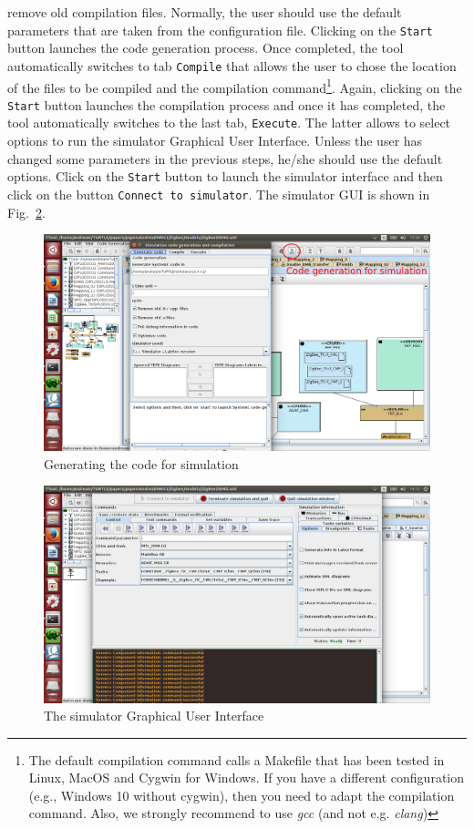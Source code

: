 \documentclass{llncs}
\newcommand{\screenshotsize}{1.0\textwidth}
\begin{document}
remove old compilation files. Normally, the user should use the default parameters that are taken from the configuration
file. Clicking on the \texttt{Start} button launches the code generation process. Once completed, the tool automatically
switches to tab \texttt{Compile} that allows the user to chose the location of the files to be compiled and the
compilation command\footnote{The default compilation command calls a Makefile that has been tested in Linux, MacOS and Cygwin for Windows. If you have a different configuration (e.g., Windows 10 without cygwin), then you need to adapt the compilation command. Also, we strongly recommend to use \textit{gcc} (and not e.g. \textit{clang})}. Again, clicking on the \texttt{Start} button launches the compilation process and once it has
completed, the tool automatically switches to the last tab, \texttt{Execute}. The latter allows to select options to run
the simulator Graphical User Interface. Unless the user has changed some parameters in the previous steps, he/she should
use the default options. Click on the \texttt{Start} button to launch the simulator interface and then click on the
button \texttt{Connect to simulator}. The simulator GUI is shown in Fig.~\ref{fig:SimuGUI1}.
%
\begin{figure}[!htbp]
	\centering
	\includegraphics[width=\screenshotsize]{figures/screenshot/CodeGenSimu.png}
	\caption{Generating the code for simulation}
	\label{fig:CodeGen1}
\end{figure}
%
\begin{figure}[!htbp]
	\centering
	\includegraphics[width=\screenshotsize]{figures/screenshot/SimuGUI1.png}
	\caption{The simulator Graphical User Interface}
	\label{fig:SimuGUI1}
\end{figure}
\end{document}
